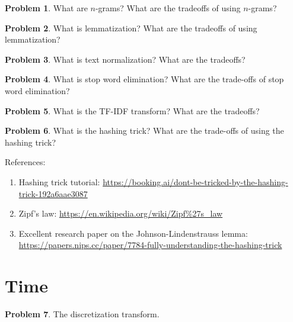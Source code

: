 \documentclass[10pt]{article}
\theoremstyle{definition}
\newtheorem{problem}{Problem}
\begin{document}
\newpage
\begin{problem}
    What are $n$-grams?
    What are the tradeoffs of using $n$-grams?
\end{problem}

\newpage
\begin{problem}
    What is lemmatization?
    What are the tradeoffs of using lemmatization?
\end{problem}

\newpage
\begin{problem}
    What is text normalization?
    What are the tradeoffs?
\end{problem}

\newpage
\begin{problem}
    What is stop word elimination?
    What are the trade-offs of stop word elimination?
\end{problem}

\newpage
\begin{problem}
    What is the TF-IDF transform?
    What are the tradeoffs?
\end{problem}

\newpage
\begin{problem}
    What is the hashing trick?
    What are the trade-offs of using the hashing trick?

    \noindent
    References:
    \begin{enumerate}
        \item Hashing trick tutorial: \url{https://booking.ai/dont-be-tricked-by-the-hashing-trick-192a6aae3087}
        \item Zipf's law: \url{https://en.wikipedia.org/wiki/Zipf%27s_law}

        \item Excellent research paper on the Johnson-Lindenstrauss lemma: \url{https://papers.nips.cc/paper/7784-fully-understanding-the-hashing-trick}
    \end{enumerate}
\end{problem}



\newpage
\section{Time}
\begin{problem}
    The discretization transform.
\end{problem}
\end{document}
